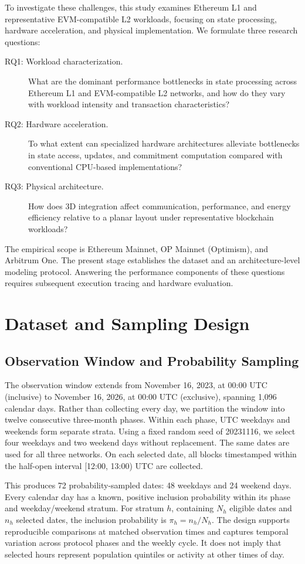 \documentclass[runningheads]{llncs}
\begin{document}
To investigate these challenges, this study examines Ethereum L1 and representative EVM-compatible L2 workloads, focusing on state processing, hardware acceleration, and physical implementation. We formulate three research questions:
\begin{description}
\item[RQ1: Workload characterization.] What are the dominant performance bottlenecks in state processing across Ethereum L1 and EVM-compatible L2 networks, and how do they vary with workload intensity and transaction characteristics?
\item[RQ2: Hardware acceleration.] To what extent can specialized hardware architectures alleviate bottlenecks in state access, updates, and commitment computation compared with conventional CPU-based implementations?
\item[RQ3: Physical architecture.] How does 3D integration affect communication, performance, and energy efficiency relative to a planar layout under representative blockchain workloads?
\end{description}
The empirical scope is Ethereum Mainnet, OP Mainnet (Optimism), and Arbitrum One. The present stage establishes the dataset and an architecture-level modeling protocol. Answering the performance components of these questions requires subsequent execution tracing and hardware evaluation.


\section{Dataset and Sampling Design}
\subsection{Observation Window and Probability Sampling}
The observation window extends from November 16, 2023, at 00:00 UTC (inclusive) to November 16, 2026, at 00:00 UTC (exclusive), spanning 1,096 calendar days. Rather than collecting every day, we partition the window into twelve consecutive three-month phases. Within each phase, UTC weekdays and weekends form separate strata. Using a fixed random seed of 20231116, we select four weekdays and two weekend days without replacement. The same dates are used for all three networks. On each selected date, all blocks timestamped within the half-open interval [12:00, 13:00) UTC are collected.

This produces 72 probability-sampled dates: 48 weekdays and 24 weekend days. Every calendar day has a known, positive inclusion probability within its phase and weekday/weekend stratum. For stratum $h$, containing $N_h$ eligible dates and $n_h$ selected dates, the inclusion probability is $\pi_h=n_h/N_h$. The design supports reproducible comparisons at matched observation times and captures temporal variation across protocol phases and the weekly cycle. It does not imply that selected hours represent population quintiles or activity at other times of day.
\end{document}

